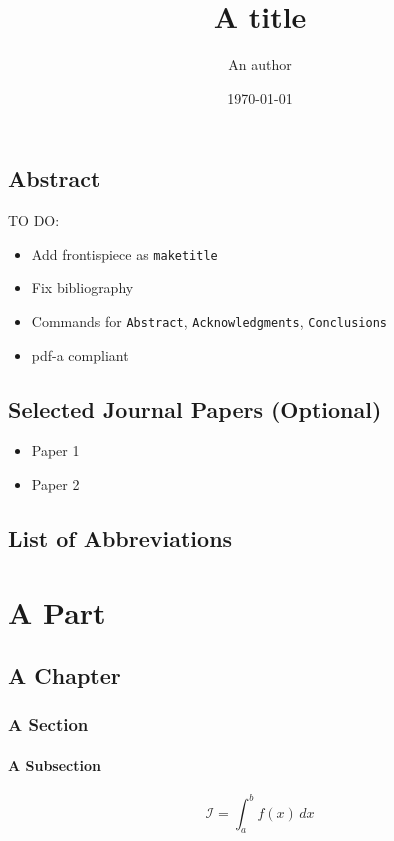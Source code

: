 \documentclass[12pt, a4paper, twoside, numbers=enddot, bibliography=totoc, listof=totoc, headings=optiontoheadandtoc]{uniudthesis}
\author{An author}
\title{A title}
\date{\today}
\begin{document}
	\maketitle
	\frontmatter\pagestyle{plain}
	\chapter{Abstract}
		TO DO:
			\begin{itemize}
				\item Add frontispiece as \texttt{maketitle}
				\item Fix bibliography
				\item Commands for \texttt{Abstract}, \texttt{Acknowledgments},
				\texttt{Conclusions}
				\item pdf-a compliant
			\end{itemize}
	\chapter{Selected Journal Papers (Optional)}
		\begin{itemize}
			\item Paper 1
			\item Paper 2
		\end{itemize}
	
	\cleardoublepage{}\tableofcontents
	\listoffigures
	\listoftables
	\chapter{List of Abbreviations}
		\lipsum[1-5]
	
	\mainmatter\pagestyle{headings}
	\part{A Part}
		\chapter{A Chapter}{}
			\section{A Section}
				\subsection{A Subsection}
				\lipsum[1-5]
					\begin{equation}
						\mathcal{I} = \int_a^b f(x)\,dx
					\end{equation}
					
\end{document}
